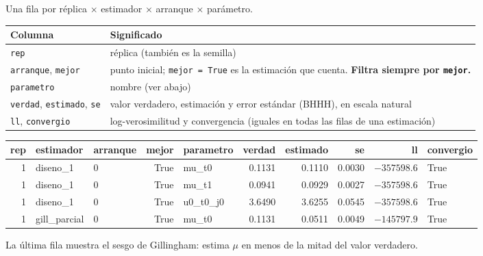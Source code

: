 \documentclass[11pt]{article}
\newcommand{\col}[1]{\texttt{#1}}
\begin{document}
Una fila por réplica $\times$ estimador $\times$ arranque $\times$ parámetro.

\begin{center}\small
\begin{adjustbox}{max width=\textwidth}\begin{tabular}{ll}
\toprule
Columna & Significado\\
\midrule
\col{rep} & réplica (también es la semilla)\\
\col{arranque}, \col{mejor} & punto inicial; \col{mejor = True} es la estimación que cuenta. \textbf{Filtra siempre por \col{mejor}.}\\
\col{parametro} & nombre (ver abajo)\\
\col{verdad}, \col{estimado}, \col{se} & valor verdadero, estimación y error estándar (BHHH), en escala natural\\
\col{ll}, \col{convergio} & log-verosimilitud y convergencia (iguales en todas las filas de una estimación)\\
\bottomrule
\end{tabular}\end{adjustbox}
\end{center}

\begin{center}\footnotesize
\begin{adjustbox}{max width=\textwidth}\begin{tabular}{rllrlrrrrl}
\toprule
rep & estimador & arranque & mejor & parametro & verdad & estimado & se & ll & convergio\\
\midrule
1 & diseno\_1 & 0 & True & mu\_t0 & 0.1131 & 0.1110 & 0.0030 & $-357598.6$ & True\\
1 & diseno\_1 & 0 & True & mu\_t1 & 0.0941 & 0.0929 & 0.0027 & $-357598.6$ & True\\
1 & diseno\_1 & 0 & True & u0\_t0\_j0 & 3.6490 & 3.6255 & 0.0545 & $-357598.6$ & True\\
1 & gill\_parcial & 0 & True & mu\_t0 & 0.1131 & 0.0511 & 0.0049 & $-145797.9$ & True\\
\bottomrule
\end{tabular}\end{adjustbox}
\end{center}
La última fila muestra el sesgo de Gillingham: estima $\mu$ en menos de la mitad del valor
verdadero.
\end{document}
